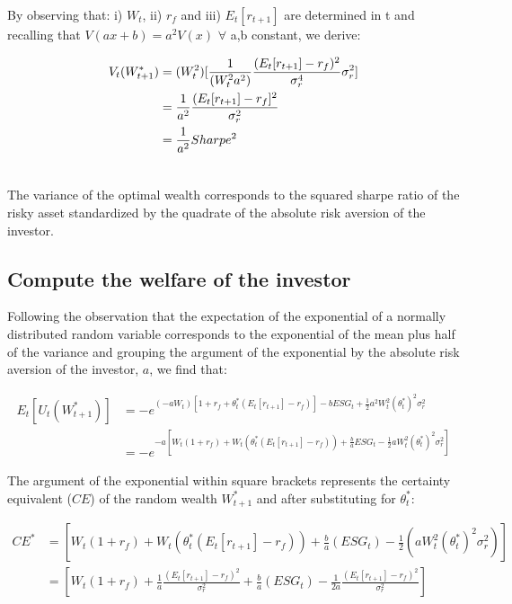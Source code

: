 \documentclass[12pt]{article}
\begin{document}
	By observing that: i) $W_t$, ii) $r_f$ and iii) $E_{t}[r_{t+1}]$ are determined in t and recalling that $V(ax + b) = a^2V(x)$ $\forall$ a,b constant, we derive: \vspace{-1.25em}
	
	\begin{align} %
		V_{t}(W_{t+1}^{*}) &= (W_t^2)[\frac{1}{(W_t^2a^2)}\frac{(E_{t}[r_{t+1}]-r_f)^2}{\sigma_r^4}\sigma_r^2] \notag \\
		&=\frac{1}{a^2}\frac{(E_{t}[r_{t+1}]-r_f]^2}{\sigma_r^2} \notag\\
		&= \frac{1}{a^2}Sharpe^2 \\	\notag
	\end{align}  \vspace{-3em}
	
	The variance of the optimal wealth corresponds to the squared sharpe ratio of the risky asset standardized by the quadrate of the absolute risk aversion of the investor.
	
	\subsection{Compute the welfare of the investor}
	
	Following the observation that the expectation of the exponential of a normally distributed random variable corresponds to the exponential of the mean plus half of the variance and grouping the argument of the exponential by the absolute risk aversion of the investor, $a$, we find that: \vspace{-1.5em}
	
	\begin{align*}
		E_t[U_{t}(W_{t+1}^{*})] &= -e^{(-aW_t) [1 + r_f + \theta_t^*(E_{t}[r_{t+1}]-r_f)] - bESG_t + \frac{1}{2}a^2W_t^2(\theta_t^{*})^2\sigma_r^2} \\
		&= -e^{-a [W_t(1 + r_f) + W_t(\theta_t^*(E_{t}[r_{t+1}]-r_f)) + \frac{b}{a}ESG_t - \frac{1}{2}aW_t^2(\theta_t^{*})^2\sigma_r^2]}
	\end{align*} \vspace{-2em}
	
	The argument of the exponential within square brackets represents the certainty equivalent ($CE$) of the random wealth $W_{t+1}^{*}$ and after substituting for $\theta_t^{*}$: \vspace{-2em}
	
	\begin{align*}
		CE^* &= [W_t(1 + r_f) + W_t(\theta_t^*(E_{t}[r_{t+1}]-r_f)) + \frac{b}{a}(ESG_t) - \frac{1}{2}(aW_t^2(\theta_t^{*})^2\sigma_r^2)] \\
		&= [W_t(1 + r_f) + \frac{1}{a}\frac{(E_{t}[r_{t+1}]-r_f)^2}{\sigma_r^2} + \frac{b}{a}(ESG_t) - \frac{1}{2a}\frac{(E_{t}[r_{t+1}]-r_f)^2}{\sigma_r^2}]
	\end{align*} \vspace{-1.5em}
	
\end{document}
